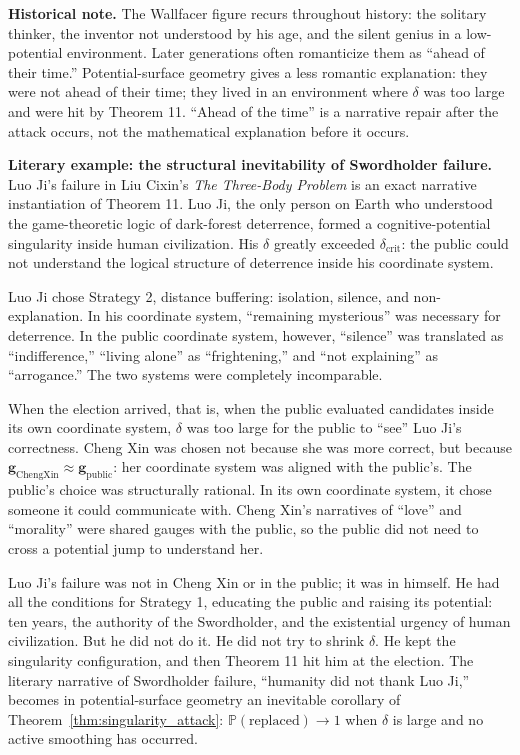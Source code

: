 \documentclass[12pt,a4paper]{article}
\theoremstyle{remark}
\newcommand{\Pbb}{\mathbb{P}}
\begin{document}
\textbf{Historical note.} The Wallfacer figure recurs throughout history: the solitary thinker, the inventor not understood by his age, and the silent genius in a low-potential environment. Later generations often romanticize them as ``ahead of their time.'' Potential-surface geometry gives a less romantic explanation: they were not ahead of their time; they lived in an environment where $\delta$ was too large and were hit by Theorem 11. ``Ahead of the time'' is a narrative repair after the attack occurs, not the mathematical explanation before it occurs.

\textbf{Literary example: the structural inevitability of Swordholder failure.} Luo Ji's failure in Liu Cixin's \textit{The Three-Body Problem} is an exact narrative instantiation of Theorem 11. Luo Ji, the only person on Earth who understood the game-theoretic logic of dark-forest deterrence, formed a cognitive-potential singularity inside human civilization. His $\delta$ greatly exceeded $\delta_{\text{crit}}$: the public could not understand the logical structure of deterrence inside his coordinate system.

Luo Ji chose Strategy 2, distance buffering: isolation, silence, and non-explanation. In his coordinate system, ``remaining mysterious'' was necessary for deterrence. In the public coordinate system, however, ``silence'' was translated as ``indifference,'' ``living alone'' as ``frightening,'' and ``not explaining'' as ``arrogance.'' The two systems were completely incomparable.

When the election arrived, that is, when the public evaluated candidates inside its own coordinate system, $\delta$ was too large for the public to ``see'' Luo Ji's correctness. Cheng Xin was chosen not because she was more correct, but because $\mathbf{g}_{\text{ChengXin}} \approx \mathbf{g}_{\text{public}}$: her coordinate system was aligned with the public's. The public's choice was structurally rational. In its own coordinate system, it chose someone it could communicate with. Cheng Xin's narratives of ``love'' and ``morality'' were shared gauges with the public, so the public did not need to cross a potential jump to understand her.

Luo Ji's failure was not in Cheng Xin or in the public; it was in himself. He had all the conditions for Strategy 1, educating the public and raising its potential: ten years, the authority of the Swordholder, and the existential urgency of human civilization. But he did not do it. He did not try to shrink $\delta$. He kept the singularity configuration, and then Theorem 11 hit him at the election. The literary narrative of Swordholder failure, ``humanity did not thank Luo Ji,'' becomes in potential-surface geometry an inevitable corollary of Theorem~\ref{thm:singularity_attack}: $\Pbb(\text{replaced}) \to 1$ when $\delta$ is large and no active smoothing has occurred.
\end{document}
